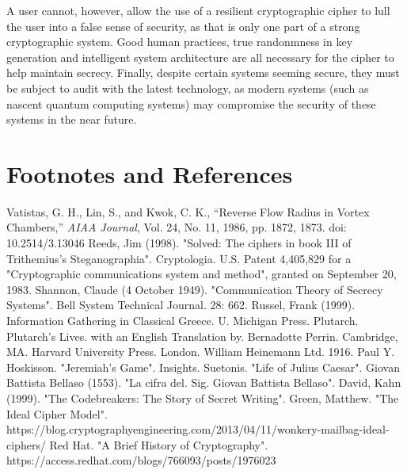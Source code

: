 \documentclass{AIAA}
\begin{document}
A user cannot, however, allow the use of a resilient cryptographic cipher to lull the user into a false sense of security, as that is only one part of a strong cryptographic system. Good human practices, true randonmness in key generation and intelligent system architecture are all necessary for the cipher to help maintain secrecy. Finally, despite certain systems seeming secure, they must be subject to audit with the latest technology, as modern systems (such as nascent quantum computing systems) may compromise the security of these systems in the near future.

\section*{Footnotes and References}

\begin{thebibliography}{}
 Vatistas, G. H., Lin, S., and Kwok, C. K., ``Reverse Flow Radius in Vortex Chambers,'' \textit{AIAA Journal}, Vol. 24, No. 11, 1986, pp. 1872, 1873. doi: 10.2514/3.13046
 Reeds, Jim (1998). "Solved: The ciphers in book III of Trithemius's Steganographia". Cryptologia.
 U.S. Patent 4,405,829 for a "Cryptographic communications system and method", granted on September 20, 1983. 
 Shannon, Claude (4 October 1949). "Communication Theory of Secrecy Systems". Bell System Technical Journal. 28: 662.
 Russel, Frank (1999). Information Gathering in Classical Greece. U. Michigan Press.
 Plutarch. Plutarch's Lives. with an English Translation by. Bernadotte Perrin. Cambridge, MA. Harvard University Press. London. William Heinemann Ltd. 1916.
 Paul Y. Hoskisson. "Jeremiah's Game". Insights.
 Suetonis. "Life of Julius Caesar".
 Giovan Battista Bellaso (1553).  "La cifra del. Sig. Giovan Battista Bellaso".
 David, Kahn (1999). "The Codebreakers: The Story of Secret Writing".
 Green, Matthew. "The Ideal Cipher Model". https://blog.cryptographyengineering.com/2013/04/11/wonkery-mailbag-ideal-ciphers/
 Red Hat. "A Brief History of Cryptography". https://access.redhat.com/blogs/766093/posts/1976023

\end{thebibliography}
\end{document}
